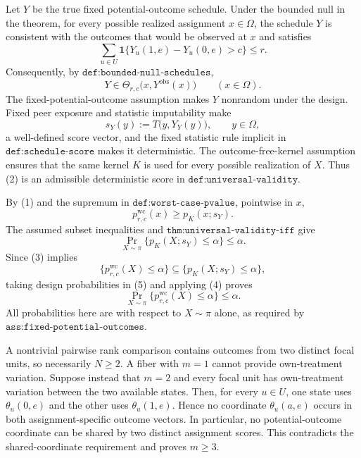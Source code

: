 Let \(Y\) be the true fixed potential-outcome schedule.  Under the bounded null in the theorem, for every possible realized assignment \(x\in\Omega\), the schedule \(Y\) is consistent with the outcomes that would be observed at \(x\) and satisfies
\[
 \sum_{u\in U}\mathbf 1\{Y_u(1,e)-Y_u(0,e)>c\}\leq r.
\]
Consequently, by \(\texttt{def:bounded-null-schedules}\),
\[
 Y\in\Theta_{r,c}\bigl(x,Y^{\mathrm{obs}}(x)\bigr)
 \qquad(x\in\Omega).
\tag{1}
\]
The fixed-potential-outcome assumption makes \(Y\) nonrandom under the design.  Fixed peer exposure and statistic imputability make
\[
 s_Y(y):=T\bigl(y,Y_Y(y)\bigr),\qquad y\in\Omega,
\tag{2}
\]
a well-defined score vector, and the fixed statistic rule implicit in \(\texttt{def:schedule-score}\) makes it deterministic.  The outcome-free-kernel assumption ensures that the same kernel \(K\) is used for every possible realization of \(X\).  Thus (2) is an admissible deterministic score in \(\texttt{def:universal-validity}\).

By (1) and the supremum in \(\texttt{def:worst-case-pvalue}\), pointwise in \(x\),
\[
 p^{\mathrm{wc}}_{r,c}(x)
 \geq p_K(x;s_Y).
\tag{3}
\]
The assumed subset inequalities and \(\texttt{thm:universal-validity-iff}\) give
\[
 \Pr_{X\sim\pi}\{p_K(X;s_Y)\leq\alpha\}\leq\alpha.
\tag{4}
\]
Since (3) implies
\[
 \{p^{\mathrm{wc}}_{r,c}(X)\leq\alpha\}
 \subseteq
 \{p_K(X;s_Y)\leq\alpha\},
\tag{5}
\]
taking design probabilities in (5) and applying (4) proves
\[
 \Pr_{X\sim\pi}\{p^{\mathrm{wc}}_{r,c}(X)\leq\alpha\}
 \leq\alpha.
\]
All probabilities here are with respect to \(X\sim\pi\) alone, as required by \(\texttt{ass:fixed-potential-outcomes}\).

A nontrivial pairwise rank comparison contains outcomes from two distinct focal units, so necessarily \(N\geq2\).  A fiber with \(m=1\) cannot provide own-treatment variation.  Suppose instead that \(m=2\) and every focal unit has own-treatment variation between the two available states.  Then, for every \(u\in U\), one state uses \(\theta_u(0,e)\) and the other uses \(\theta_u(1,e)\).  Hence no coordinate \(\theta_u(a,e)\) occurs in both assignment-specific outcome vectors.  In particular, no potential-outcome coordinate can be shared by two distinct assignment scores.  This contradicts the shared-coordinate requirement and proves \(m\geq3\).

